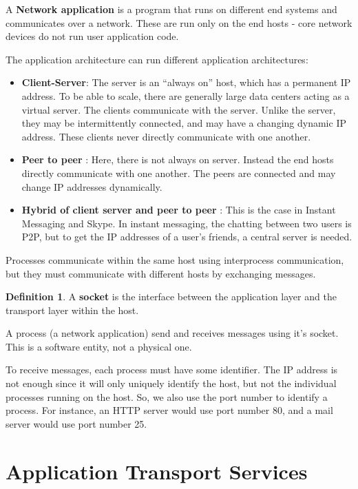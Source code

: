 \documentclass[12pt,letterpaper]{amsbook}
\theoremstyle{definition}
\newtheorem{definition}{Definition}[section] %
\begin{document}
A \textbf{Network application} is a program that runs on different end systems and communicates over a network. These are run only on the end hosts - core network devices do not run user application code.

The application architecture can run different application architectures:

\begin{itemize}
  \item \textbf{Client-Server}: The server is an ``always on'' host, which has a permanent IP address. To be able to scale, there are generally large data centers acting as a virtual server. The clients communicate with the server. Unlike the server, they may be intermittently connected, and may have a changing dynamic IP address. These clients never directly communicate with one another.
  \item \textbf{Peer to peer} : Here, there is not always on server. Instead the end hosts directly communicate with one another. The peers are connected and may change IP addresses dynamically.
  \item \textbf{Hybrid of client server and peer to peer} : This is the case in Instant Messaging and Skype. In instant messaging, the chatting between two users is P2P, but to get the IP addresses of a user's friends, a central server is needed.
\end{itemize}

Processes communicate within the same host using interprocess communication, but they must communicate with different hosts by exchanging messages.

\begin{definition}
  A \textbf{socket} is the interface between the application layer and the transport layer within the host.  
\end{definition}

A process (a network application) send and receives messages using it's socket. This is a software entity, not a physical one.

To receive messages, each process must have some identifier. The IP address is not enough since it will only uniquely identify the host, but not the individual processes running on the host. So, we also use the port number to identify a process. For instance, an HTTP server would use port number 80, and a mail server would use port number 25.

\section{Application Transport Services}
\end{document}
